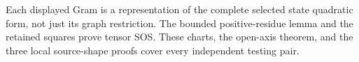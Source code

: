 Each displayed Gram is a representation of the complete selected
state quadratic form, not just its graph restriction. The bounded
positive-residue lemma and the retained squares prove tensor SOS.
These charts, the open-axis theorem, and the three local source-shape
proofs cover every independent testing pair.
